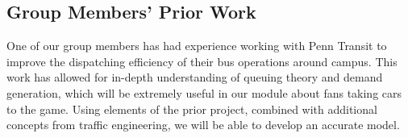 \subsection{Group Members' Prior Work}
One of our group members has had experience working with Penn Transit
to improve the dispatching efficiency of their bus operations around
campus. This work has allowed for in-depth understanding of queuing
theory and demand generation, which will be extremely useful in our
module about fans taking cars to the game. Using elements of the prior
project, combined with additional concepts from traffic engineering,
we will be able to develop an accurate model.
